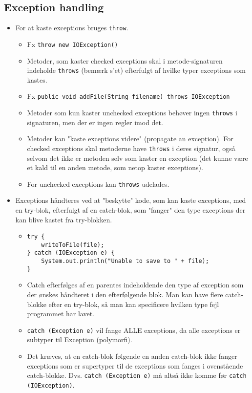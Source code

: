 \subsection{Exception handling}
\begin{itemize}
  \item For at kaste exceptions bruges \verb|throw|.
  \begin{itemize}
    \item Fx \verb|throw new IOException()|
    \item Metoder, som kaster checked exceptions skal i metode-signaturen indeholde \verb|throws| (bemærk s'et) efterfulgt af hvilke typer exceptions som kastes.
    \item Fx \verb|public void addFile(String filename) throws IOException|
    \item Metoder som kun kaster unchecked exceptions behøver ingen \verb|throws| i signaturen, men der er ingen regler imod det.
    \item Metoder kan "kaste exceptions videre" (propagate an exception). For checked exceptions skal metoderne have \verb|throws| i deres signatur, også selvom det ikke er metoden selv som kaster en exception (det kunne være et kald til en anden metode, som netop kaster exceptions).
    \item For unchecked exceptions kan \verb|throws| udelades.
  \end{itemize}
  \item Exceptions håndteres ved at "beskytte" kode, som kan kaste exceptions, med en try-blok, efterfulgt af en catch-blok, som "fanger" den type exceptions der kan blive kastet fra try-blokken.
  \begin{itemize}
    \item
      \begin{verbatim}
try {
    writeToFile(file);
} catch (IOException e) {
    System.out.println("Unable to save to " + file);
}
      \end{verbatim}
    \item Catch efterfølges af en parentes indeholdende den type af exception som der ønskes håndteret i den efterfølgende blok. Man kan have flere catch-blokke efter en try-blok, så man kan specificere hvilken type fejl programmet har lavet.
    \item \verb|catch (Exception e)| vil fange ALLE exceptions, da alle exceptions er subtyper til Exception (polymorfi).
    \item Det kræves, at en catch-blok følgende en anden catch-blok ikke fanger exceptions som er supertyper til de exceptions som fanges i ovenstående catch-blokke. Dvs. \verb|catch (Exception e)| må altså ikke komme før \verb|catch (IOException)|.

\end{itemize}
\end{itemize}
